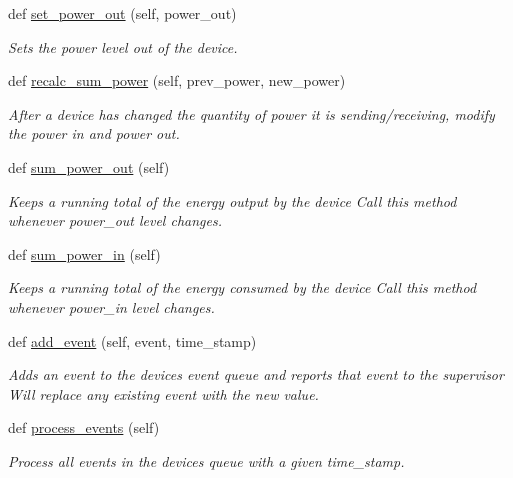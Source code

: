 \begin{DoxyCompactItemize}
def \hyperlink{class_build_1_1_objects_1_1device_1_1_device_a75d4f47040d95f6e5adb6238cf9e2463}{set\+\_\+power\+\_\+out} (self, power\+\_\+out)
\begin{DoxyCompactList}\small\item\em Sets the power level out of the device. \end{DoxyCompactList}\item 
def \hyperlink{class_build_1_1_objects_1_1device_1_1_device_a576ceef658b74d05291b3dbc2b1ba1da}{recalc\+\_\+sum\+\_\+power} (self, prev\+\_\+power, new\+\_\+power)
\begin{DoxyCompactList}\small\item\em After a device has changed the quantity of power it is sending/receiving, modify the power in and power out. \end{DoxyCompactList}\item 
def \hyperlink{class_build_1_1_objects_1_1device_1_1_device_acbaf978b589fe80b8d4da2f25b266b32}{sum\+\_\+power\+\_\+out} (self)
\begin{DoxyCompactList}\small\item\em Keeps a running total of the energy output by the device Call this method whenever power\+\_\+out level changes. \end{DoxyCompactList}\item 
def \hyperlink{class_build_1_1_objects_1_1device_1_1_device_a6a7287bc43dacb4ab23d04dbd8c01d2f}{sum\+\_\+power\+\_\+in} (self)
\begin{DoxyCompactList}\small\item\em Keeps a running total of the energy consumed by the device Call this method whenever power\+\_\+in level changes. \end{DoxyCompactList}\item 
def \hyperlink{class_build_1_1_objects_1_1device_1_1_device_a8e39400d2e8cf584f912ee9fcccddd2b}{add\+\_\+event} (self, event, time\+\_\+stamp)
\begin{DoxyCompactList}\small\item\em Adds an event to the device\textquotesingle{}s event queue and reports that event to the supervisor Will replace any existing event with the new value. \end{DoxyCompactList}\item 
def \hyperlink{class_build_1_1_objects_1_1device_1_1_device_a49c8b4c3d1c3ca5cc2a070bf6761af8a}{process\+\_\+events} (self)
\begin{DoxyCompactList}\small\item\em Process all events in the device\textquotesingle{}s queue with a given time\+\_\+stamp. \end{DoxyCompactList}\item 

\end{DoxyCompactItemize}
